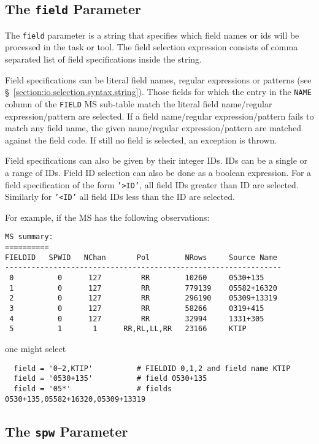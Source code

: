 \subsection{The {\tt field} Parameter}
\label{section:io.selection.field}

The {\tt field} parameter is a string that specifies which field
names or ids will be processed in the task or tool.
The field selection expression consists of comma separated list of
field specifications inside the string.

Field specifications can be literal field names, regular expressions
or patterns (see \S~\ref{section:io.selection.syntax.string}).  
Those fields for which the entry in the {\tt NAME} column of
the {\tt FIELD} MS sub-table match the literal field name/regular
expression/pattern are selected.
If a field name/regular expression/pattern fails to match any field
name, the given name/regular expression/pattern are matched against
the field code.  If still no field is selected, an exception is thrown.

Field specifications can also be given by their integer IDs.  IDs can
be a single or a range of IDs.  Field ID selection can also be done as
a boolean expression.  For a field specification of the form {\tt '>ID'},
all field IDs greater than ID are selected.  Similarly for {\tt '<ID'} all
field IDs less than the ID are selected.

For example, if the MS has the following observations:
\small
\begin{verbatim}
MS summary:
==========
FIELDID   SPWID   NChan       Pol        NRows     Source Name
---------------------------------------------------------------
 0          0      127         RR        10260     0530+135
 1          0      127         RR        779139    05582+16320
 2          0      127         RR        296190    05309+13319
 3          0      127         RR        58266     0319+415
 4          0      127         RR        32994     1331+305
 5          1       1      RR,RL,LL,RR   23166     KTIP
\end{verbatim}
\normalsize
one might select
\small
\begin{verbatim}
  field = '0~2,KTIP'          # FIELDID 0,1,2 and field name KTIP
  field = '0530+135'          # field 0530+135
  field = '05*'               # fields 0530+135,05582+16320,05309+13319
\end{verbatim}
\normalsize

\subsection{The {\tt spw} Parameter}
\label{section:io.selection.spw}

